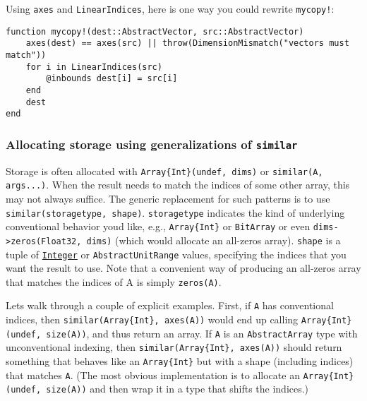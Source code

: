 Using \texttt{axes} and \texttt{LinearIndices}, here is one way you could rewrite \texttt{mycopy!}:




\begin{verbatim}
function mycopy!(dest::AbstractVector, src::AbstractVector)
    axes(dest) == axes(src) || throw(DimensionMismatch("vectors must match"))
    for i in LinearIndices(src)
        @inbounds dest[i] = src[i]
    end
    dest
end
\end{verbatim}



\hypertarget{8664586686165592487}{}


\subsubsection{Allocating storage using generalizations of \texttt{similar}}



Storage is often allocated with \texttt{Array\{Int\}(undef, dims)} or \texttt{similar(A, args...)}. When the result needs to match the indices of some other array, this may not always suffice. The generic replacement for such patterns is to use \texttt{similar(storagetype, shape)}.  \texttt{storagetype} indicates the kind of underlying {\textquotedbl}conventional{\textquotedbl} behavior you{\textquotesingle}d like, e.g., \texttt{Array\{Int\}} or \texttt{BitArray} or even \texttt{dims->zeros(Float32, dims)} (which would allocate an all-zeros array). \texttt{shape} is a tuple of \hyperlink{8469131683393450448}{\texttt{Integer}} or \texttt{AbstractUnitRange} values, specifying the indices that you want the result to use. Note that a convenient way of producing an all-zeros array that matches the indices of A is simply \texttt{zeros(A)}.



Let{\textquotesingle}s walk through a couple of explicit examples. First, if \texttt{A} has conventional indices, then \texttt{similar(Array\{Int\}, axes(A))} would end up calling \texttt{Array\{Int\}(undef, size(A))}, and thus return an array.  If \texttt{A} is an \texttt{AbstractArray} type with unconventional indexing, then \texttt{similar(Array\{Int\}, axes(A))} should return something that {\textquotedbl}behaves like{\textquotedbl} an \texttt{Array\{Int\}} but with a shape (including indices) that matches \texttt{A}.  (The most obvious implementation is to allocate an \texttt{Array\{Int\}(undef, size(A))} and then {\textquotedbl}wrap{\textquotedbl} it in a type that shifts the indices.)



